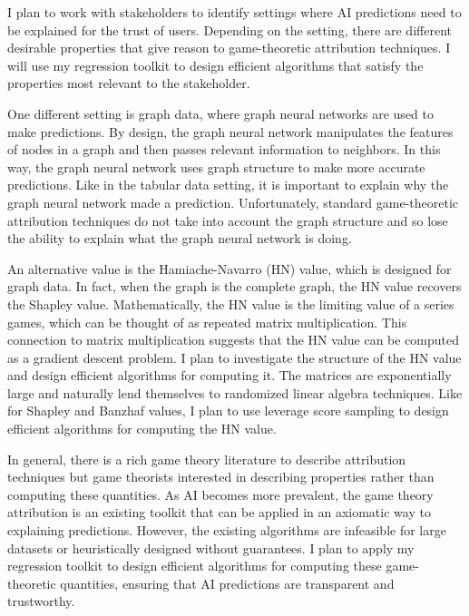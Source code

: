 \documentclass[11pt]{article}
\begin{document}
{I plan to work with stakeholders to identify settings where AI predictions need to be explained for the trust of users.
Depending on the setting, there are different desirable properties that give reason to game-theoretic attribution techniques.
I will use my regression toolkit to design efficient algorithms that satisfy the properties most relevant to the stakeholder.

One different setting is graph data, where graph neural networks are used to make predictions.
By design, the graph neural network manipulates the features of nodes in a graph and then passes relevant information to neighbors.
In this way, the graph neural network uses graph structure to make more accurate predictions.
Like in the tabular data setting, it is important to explain why the graph neural network made a prediction.
Unfortunately, standard game-theoretic attribution techniques do not take into account the graph structure and so lose the ability to explain what the graph neural network is doing.

An alternative value is the Hamiache-Navarro (HN) value, which is designed for graph data.
In fact, when the graph is the complete graph, the HN value recovers the Shapley value.
Mathematically, the HN value is the limiting value of a series games, which can be thought of as repeated matrix multiplication.
This connection to matrix multiplication suggests that the HN value can be computed as a gradient descent problem.
I plan to investigate the structure of the HN value and design efficient algorithms for computing it.
The matrices are exponentially large and naturally lend themselves to randomized linear algebra techniques.
Like for Shapley and Banzhaf values, I plan to use leverage score sampling to design efficient algorithms for computing the HN value.

In general, there is a rich game theory literature to describe attribution techniques but game theorists interested in describing properties rather than computing these quantities.
As AI becomes more prevalent, the game theory attribution is an existing toolkit that can be applied in an axiomatic way to explaining predictions.
However, the existing algorithms are infeasible for large datasets or heuristically designed without guarantees.
I plan to apply my regression toolkit to design efficient algorithms for computing these game-theoretic quantities, ensuring that AI predictions are transparent and trustworthy.

}
\end{document}
